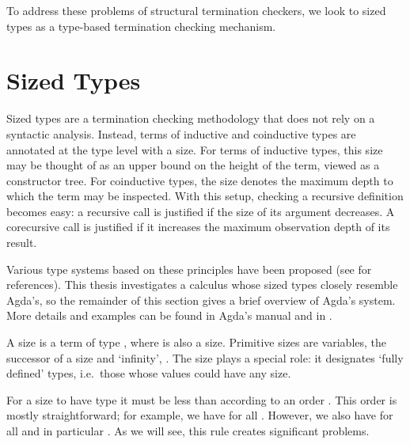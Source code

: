 To address these problems of structural termination checkers, we look to sized
types as a type-based termination checking mechanism.


\section{Sized Types}
\label{sec:background:sized}

Sized types are a termination checking methodology that does not rely on a
syntactic analysis. Instead, terms of inductive and coinductive types are
annotated at the type level with a size. For terms of inductive types, this size
may be thought of as an upper bound on the height of the term, viewed as a
constructor tree. For coinductive types, the size denotes the maximum depth to
which the term may be inspected. With this setup, checking a recursive
definition becomes easy: a recursive call is justified if the size of its
argument decreases. A corecursive call is justified if it increases the maximum
observation depth of its result.

Various type systems based on these principles have been proposed (see
 for references). This thesis investigates a calculus
whose sized types closely resemble Agda's, so the remainder of this section
gives a brief overview of Agda's system. More details and examples can be found
in Agda's manual \cite{agdamanual} and in \cite{abel2016}.

A size is a term of type , where  is also a size.
Primitive sizes are variables, the successor of a size  and
\enquote*{infinity}, . The size  plays a special role: it
designates \enquote*{fully defined} types, i.e.\ those whose values could have any
size.

For a size  to have type  it must be less than
 according to an order \icode{<}. This order is mostly straightforward;
for example, we have  for all . However, we also have
 for all  and in particular . As we will see,
this rule creates significant problems.

